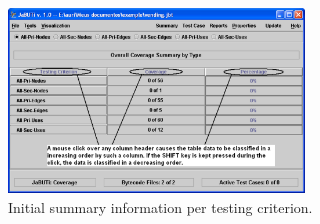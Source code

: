 \begin{figure}[!ht]
\begin{center}
\includegraphics[width=0.70\textwidth]{fig/summary-by-criterion-initial-edited.eps}
\caption{\label{fig:initial-summary-criterion} Initial summary
information per testing criterion.}
\end{center}
\end{figure}
